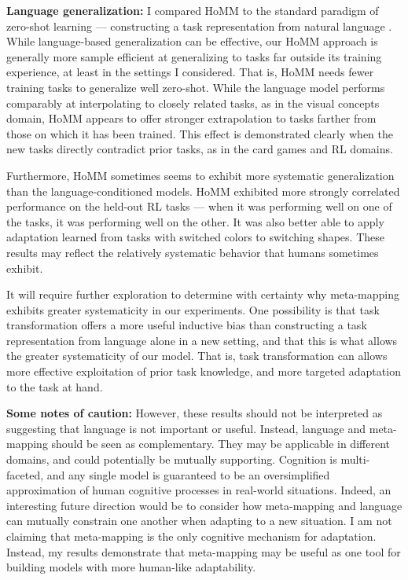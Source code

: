 \textbf{Language generalization:} I compared HoMM to the standard paradigm of zero-shot learning --- constructing a task representation from natural language \citep[e.g.][also see below]{Larochelle2008}. While language-based generalization can be effective, our HoMM approach is generally more sample efficient at generalizing to tasks far outside its training experience, at least in the settings I considered. That is, HoMM needs fewer training tasks to generalize well zero-shot. While the language model performs comparably at interpolating to closely related tasks, as in the visual concepts domain, HoMM appears to offer stronger extrapolation to tasks farther from those on which it has been trained. This effect is demonstrated clearly when the new tasks directly contradict prior tasks, as in the card games and RL domains.\par

Furthermore, HoMM sometimes seems to exhibit more systematic generalization than the language-conditioned models. HoMM exhibited more strongly correlated performance on the held-out RL tasks --- when it was performing well on one of the tasks, it was performing well on the other. It was also better able to apply adaptation learned from tasks with switched colors to switching shapes. These results may reflect the relatively systematic behavior that humans sometimes exhibit. \par

It will require further exploration to determine with certainty why meta-mapping exhibits greater systematicity in our experiments. One possibility is that task transformation offers a more useful inductive bias than constructing a task representation from language alone in a new setting, and that this is what allows the greater systematicity of our model. That is, task transformation can allows more effective exploitation of prior task knowledge, and more targeted adaptation to the task at hand. \par

\textbf{Some notes of caution:} However, these results should not be interpreted as suggesting that language is not important or useful. Instead, language and meta-mapping should be seen as complementary. They may be applicable in different domains, and could potentially be mutually supporting. Cognition is multi-faceted, and any single model is guaranteed to be an oversimplified approximation of human cognitive processes in real-world situations. Indeed, an interesting future direction would be to consider how meta-mapping and language can mutually constrain one another when adapting to a new situation. I am not claiming that meta-mapping is the only cognitive mechanism for adaptation. Instead, my results demonstrate that meta-mapping may be useful as one tool for building models with more human-like adaptability.  \par

